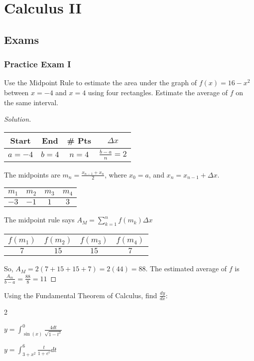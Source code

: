 \documentclass[crop=false,class=book]{standalone}
\begin{document}
\chapter{Calculus II}
\section{Exams}
\subsection{Practice Exam I}
\begin{problem}
Use the Midpoint Rule to estimate the area under the graph of $f(x)=16-x^{2}$ between $x=-4$ and $x=4$ using four rectangles. Estimate the average of $f$ on the same interval.
\end{problem}
\begin{proof}[Solution]
\
\begin{table}[H]
    \centering
    \begin{tabular}{|c|c|c|c|}
        \hline
        Start&End&\# Pts&$\Delta x$\\
        \hline
        $a=-4$&$b=4$&$n=4$&$\frac{b-a}{n}=2$\\
        \hline
    \end{tabular}
\end{table}
The midpoints are $m_{n}=\frac{x_{n-1}+x_{n}}{2}$, where $x_{0}=a$, and $x_{n}=x_{n-1}+\Delta x$.
\begin{table}[H]
    \centering
    \begin{tabular}{|c|c|c|c|}
        \hline
        $m_{1}$&$m_{2}$&$m_{3}$&$m_{4}$\\
        \hline
        $-3$&$-1$&$1$&$3$\\
        \hline
    \end{tabular}
\end{table}
The midpoint rule says $A_{M}=\sum_{k=1}^{n}f(m_{k})\Delta x$
\begin{table}[H]
    \centering
    \begin{tabular}{|c|c|c|c|}
        \hline
        $f(m_{1})$&$f(m_{2})$&$f(m_{3})$&$f(m_{4})$\\
        \hline
        $7$&$15$&$15$&$7$\\
        \hline
    \end{tabular}
\end{table}
So, $A_{M}=2(7+15+15+7)=2(44)=88$. The estimated average of $f$ is $\frac{A_{m}}{b-a}=\frac{88}{8}=11$
\end{proof}
\begin{problem}
Using the Fundamental Theorem of Calculus, find $\frac{dy}{dx}$:
\begin{enumerate}
\end{enumerate}
\end{problem}
\end{document}
